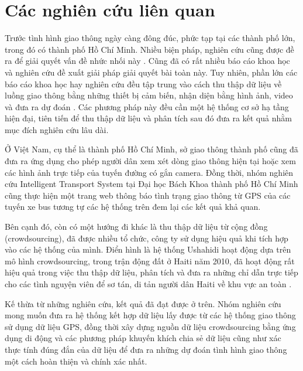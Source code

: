 
\chapter{Các nghiên cứu liên quan} %

\label{Chapter2} %

Trước tình hình giao thông ngày càng đông đúc, phức tạp tại các thành phố lớn, trong đó có thành phố Hồ Chí Minh. Nhiều biện pháp, nghiên cứu cũng được đề ra để giải quyết vấn đề nhức nhối này \cite{FSPPM}. Cũng đã có rất nhiều báo cáo khoa học và nghiên cứu đề xuất giải pháp giải quyết bài toàn này. Tuy nhiên, phần lớn các báo cáo khoa học hay nghiên cứu đều tập trung vào cách thu thập dữ liệu về luồng giao thông bằng những thiết bị cảm biến, nhận diện bằng hình ảnh, video và đưa ra dự đoán \cite{VEGV} \cite{RTD}. Các phương pháp này đều cần một hệ thống cơ sở hạ tầng hiện đại, tiên tiến để thu thập dữ liệu và phân tích sau đó đưa ra kết quả nhằm mục đích nghiên cứu lâu dài.

Ở Việt Nam, cụ thể là thành phố Hồ Chí Minh, sở giao thông thành phố cũng đã đưa ra ứng dụng \cite{VOVAPP} cho phép người dân xem xét dòng giao thông hiện tại hoặc xem các hình ảnh trực tiếp của tuyến đường có gắn camera. Đồng thời, nhóm nghiên cứu Intelligent Transport System tại Đại học Bách Khoa thành phố Hồ Chí Minh cũng thực hiện một trang web \cite{HCMUT} thông báo tình trạng giao thông từ GPS của các tuyến xe bus tương tự các hệ thống trên đem lại các kết quả khả quan.

Bên cạnh đó, còn có một hướng đi khác là thu thập dữ liệu từ cộng đồng (crowdsourcing), đã được nhiều tổ chức, công ty \cite{16} sử dụng hiệu quả khi tích hợp vào các hệ thống của mình. Điển hình là hệ thống Ushahidi hoạt động dựa trên mô hình crowdsourcing, trong trận động đất ở Haiti năm 2010, đã hoạt động rất hiệu quả trong việc thu thập dữ liệu, phân tích và đưa ra những chỉ dẫn trực tiếp cho các tình nguyện viên để sơ tán, di tản người dân Haiti về khu vực an toàn \cite{23} \cite{24}.

Kế thừa từ những nghiên cứu, kết quả đã đạt được ở trên. Nhóm nghiên cứu mong muốn đưa ra hệ thống kết hợp dữ liệu lấy được từ các hệ thống giao thông sử dụng dữ liệu GPS, đồng thời xây dựng nguồn dữ liệu crowdsourcing bằng ứng dụng di động và các phương pháp khuyến khích chia sẻ dữ liệu cũng như xác thực tính đúng đắn của dữ liệu để đưa ra những dự đoán tình hình giao thông một cách hoàn thiện và chính xác nhất. 